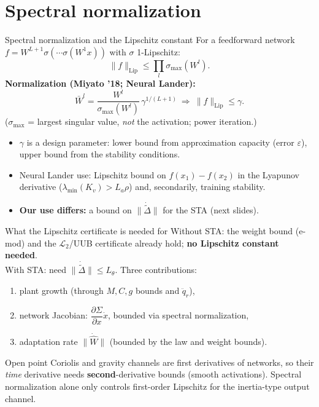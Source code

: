 \documentclass[aspectratio=169,10pt]{beamer}
\newcommand{\lmin}{\lambda_{\min}}
\begin{document}
\section{Spectral normalization}
\begin{frame}{Spectral normalization and the Lipschitz constant}
For a feedforward network $f=W^{L+1}\sigma(\cdots\sigma(W^1x))$ with $\sigma$ 1-Lipschitz:
\[
\|f\|_{\mathrm{Lip}}\le\prod_l\sigma_{\max}(W^l).
\]
\textbf{Normalization (Miyato '18; Neural Lander):}
\[
\bar W^l=\frac{W^l}{\sigma_{\max}(W^l)}\,\gamma^{1/(L+1)}\ \Rightarrow\ \|f\|_{\mathrm{Lip}}\le\gamma .
\]
($\sigma_{\max}$ = largest singular value, \emph{not} the activation; power iteration.)
\begin{itemize}
\item $\gamma$ is a design parameter: lower bound from approximation capacity (error $\varepsilon$), upper bound from the stability conditions.
\item Neural Lander use: Lipschitz bound on $f(x_1)-f(x_2)$ in the Lyapunov derivative ($\lmin(K_v)>L_a\rho$) and, secondarily, training stability.
\item \textbf{Our use differs:} a bound on $\|\dot{\tilde\Delta}\|$ for the STA (next slides).
\end{itemize}
\end{frame}

\begin{frame}{What the Lipschitz certificate is needed for}
Without STA: the weight bound (e-mod) and the $\mathcal L_2$/UUB certificate already hold; \textbf{no Lipschitz constant needed}.\\[1mm]
With STA: need $\|\dot{\tilde\Delta}\|\le L_\theta$. Three contributions:
\begin{enumerate}
\item plant growth (through $M,C,g$ bounds and $\ddot q_r$),
\item network Jacobian: $\dfrac{\partial\Sigma}{\partial x}\dot x$, bounded via spectral normalization,
\item adaptation rate $\|\dot{\hat W}\|$ (bounded by the law and weight bounds).
\end{enumerate}
\begin{alertblock}{Open point}
Coriolis and gravity channels are first derivatives of networks, so their \emph{time} derivative needs \textbf{second}-derivative bounds (smooth activations). Spectral normalization alone only controls first-order Lipschitz for the inertia-type output channel.
\end{alertblock}
\end{frame}
\end{document}
